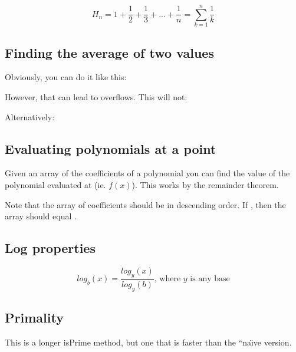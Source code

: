 $$H_n = 1 + \frac{1}{2} + \frac{1}{3} + ... + \frac{1}{n} = \sum_{k=1}^n \frac{1}{k}$$

\subsection*{Finding the average of two values}

Obviously, you can do it like this: 

However, that can lead to overflows. This will not: 

Alternatively: 

\subsection*{Evaluating polynomials at a point}

Given an array of the coefficients of a polynomial you can find the value of the polynomial evaluated at  (ie. $f(x)$). This works by the remainder theorem.



Note that the array of coefficients should be in descending order. If , then the array should equal .

\subsection*{Log properties}

$$log_b(x) = \frac{log_y(x)}{log_y(b)} \text{, where } y \text{ is any base}$$

\subsection*{Primality}

This is a longer isPrime method, but one that is faster than the “na\"{\i}ve version.



\newpage